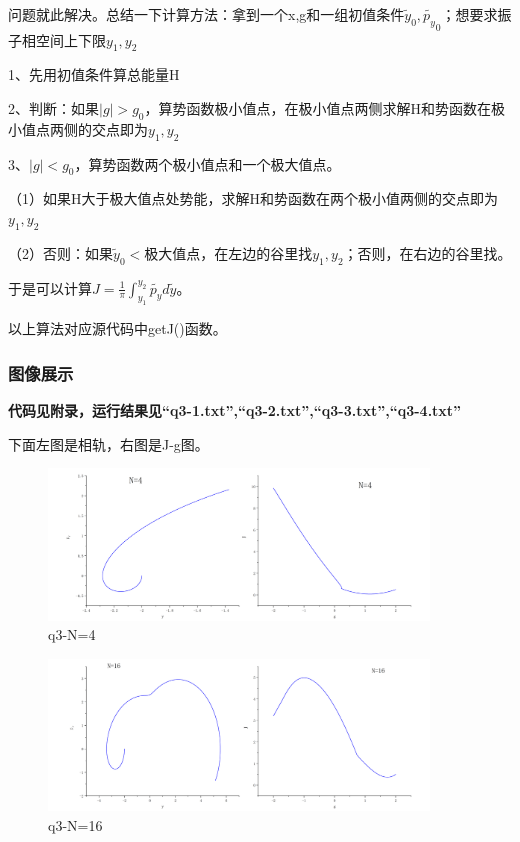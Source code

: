 \documentclass[10pt, a4paper]{article}
\newcommand{\wy}{\widetilde{y}}
\newcommand{\wpy}{\widetilde{p_y}}
\begin{document}
    
    问题就此解决。总结一下计算方法：拿到一个x,g和一组初值条件$\wy_0,\wpy_0$；想要求振子相空间上下限$y_1,y_2$

    1、先用初值条件算总能量H

    2、判断：如果$|g|>g_0$，算势函数极小值点，在极小值点两侧求解H和势函数在极小值点两侧的交点即为$y_1,y_2$

    3、$|g|<g_0$，算势函数两个极小值点和一个极大值点。

    （1）如果H大于极大值点处势能，求解H和势函数在两个极小值两侧的交点即为$y_1,y_2$

    （2）否则：如果$\wy_0<$极大值点，在左边的谷里找$y_1,y_2$；否则，在右边的谷里找。

    于是可以计算$J=\frac{1}{\pi}\int_{y_1}^{y_2}\wpy d\wy$。

    以上算法对应源代码中getJ()函数。

    \subsubsection{图像展示}

    \textbf{代码见附录，运行结果见“q3-1.txt”,“q3-2.txt”,“q3-3.txt”,“q3-4.txt”}
    

    下面左图是相轨，右图是J-g图。

    \begin{figure}[H]
        \centering
        \includegraphics[width=0.9\textwidth]{q3-N=4.jpg}
        \caption{q3-N=4}\label{q3-N=4}
    \end{figure}

    \begin{figure}[H]
        \centering
        \includegraphics[width=0.9\textwidth]{q3-N=16.jpg}
        \caption{q3-N=16}\label{q3-N=16}
    \end{figure}
\end{document}

